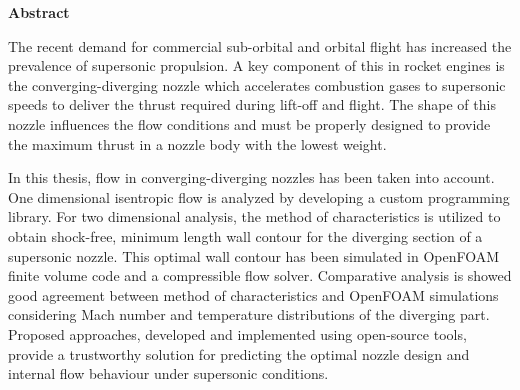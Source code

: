 \begin{titlepage}
	{\color{white}
	\begin{center}
		
		\LARGE{\textbf{Abstract}}
			
	\end{center}
	
	The recent demand for commercial sub-orbital and orbital flight has increased the prevalence of supersonic propulsion. A key component of this in rocket engines is the converging-diverging nozzle which accelerates combustion gases to supersonic speeds to deliver the thrust required during lift-off and flight. The shape of this nozzle influences the flow conditions and must be properly designed to provide the maximum thrust in a nozzle body with the lowest weight. 
	
	In this thesis, flow in converging-diverging nozzles has been taken into account. One dimensional isentropic flow is analyzed by developing a custom programming library. For two dimensional analysis, the method of characteristics is utilized to obtain shock-free, minimum length wall contour for the diverging section of a supersonic nozzle. This optimal wall contour has been simulated in OpenFOAM finite volume code and a compressible flow solver. Comparative analysis is showed good agreement between method of characteristics and OpenFOAM simulations considering Mach number and temperature distributions of the diverging part. Proposed approaches, developed and implemented using open-source tools, provide a trustworthy solution for predicting the optimal nozzle design and internal flow behaviour under supersonic conditions.
		
	
}
	\pagecolor{black}\afterpage{\nopagecolor}

\end{titlepage}
